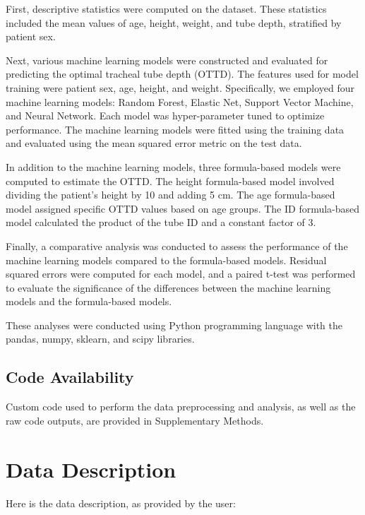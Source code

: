 \documentclass[11pt]{article}
\begin{document}
First, descriptive statistics were computed on the dataset. These statistics included the mean values of age, height, weight, and tube depth, stratified by patient sex.

Next, various machine learning models were constructed and evaluated for predicting the optimal tracheal tube depth (OTTD). The features used for model training were patient sex, age, height, and weight. Specifically, we employed four machine learning models: Random Forest, Elastic Net, Support Vector Machine, and Neural Network. Each model was hyper-parameter tuned to optimize performance. The machine learning models were fitted using the training data and evaluated using the mean squared error metric on the test data.

In addition to the machine learning models, three formula-based models were computed to estimate the OTTD. The height formula-based model involved dividing the patient's height by 10 and adding 5 cm. The age formula-based model assigned specific OTTD values based on age groups. The ID formula-based model calculated the product of the tube ID and a constant factor of 3.

Finally, a comparative analysis was conducted to assess the performance of the machine learning models compared to the formula-based models. Residual squared errors were computed for each model, and a paired t-test was performed to evaluate the significance of the differences between the machine learning models and the formula-based models. 

These analyses were conducted using Python programming language with the pandas, numpy, sklearn, and scipy libraries.\subsection*{Code Availability}

Custom code used to perform the data preprocessing and analysis, as well as the raw code outputs, are provided in Supplementary Methods.


\clearpage
\appendix

\section{Data Description} \label{sec:data_description} Here is the data description, as provided by the user:
\end{document}
